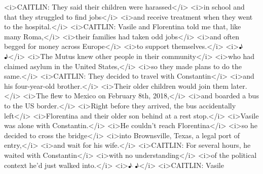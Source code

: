 \begin{itemize}
  \textless{}i\textgreater{}CAITLIN: They said their children were
  harassed\textless{}/i\textgreater{} \textless{}i\textgreater{}in
  school and that they struggled to find jobs\textless{}/i\textgreater{}
  \textless{}i\textgreater{}and receive treatment when they went to the
  hospital.\textless{}/i\textgreater{}
  \textless{}i\textgreater{}CAITLIN: Vasile and Florentina told me that,
  like many Roma,\textless{}/i\textgreater{}
  \textless{}i\textgreater{}their families had taken odd
  jobs\textless{}/i\textgreater{} \textless{}i\textgreater{}and often
  begged for money across Europe\textless{}/i\textgreater{}
  \textless{}i\textgreater{}to support
  themselves.\textless{}/i\textgreater{} \textless{}i\textgreater{}♪
  ♪\textless{}/i\textgreater{} \textless{}i\textgreater{}The Mutus knew
  other people in their community\textless{}/i\textgreater{}
  \textless{}i\textgreater{}who had claimed asylum in the United
  States,\textless{}/i\textgreater{} \textless{}i\textgreater{}so they
  made plans to do the same.\textless{}/i\textgreater{}
  \textless{}i\textgreater{}CAITLIN: They decided to travel with
  Constantin\textless{}/i\textgreater{} \textless{}i\textgreater{}and
  his four-year-old brother.\textless{}/i\textgreater{}
  \textless{}i\textgreater{}Their older children would join them
  later.\textless{}/i\textgreater{} \textless{}i\textgreater{}The flew
  to Mexico on February 8th, 2018,\textless{}/i\textgreater{}
  \textless{}i\textgreater{}and boarded a bus to the US
  border.\textless{}/i\textgreater{} \textless{}i\textgreater{}Right
  before they arrived, the bus accidentally
  left\textless{}/i\textgreater{} \textless{}i\textgreater{}Florentina
  and their older son behind at a rest stop.\textless{}/i\textgreater{}
  \textless{}i\textgreater{}Vasile was alone with
  Constantin.\textless{}/i\textgreater{} \textless{}i\textgreater{}He
  couldn't reach Florentina\textless{}/i\textgreater{}
  \textless{}i\textgreater{}so he decided to cross the
  bridge\textless{}/i\textgreater{} \textless{}i\textgreater{}into
  Brownsville, Texas, a legal port of entry,\textless{}/i\textgreater{}
  \textless{}i\textgreater{}and wait for his
  wife.\textless{}/i\textgreater{} \textless{}i\textgreater{}CAITLIN:
  For several hours, he waited with
  Constantin\textless{}/i\textgreater{} \textless{}i\textgreater{}with
  no understanding\textless{}/i\textgreater{}
  \textless{}i\textgreater{}of the political context he'd just walked
  into.\textless{}/i\textgreater{} \textless{}i\textgreater{}♪
  ♪\textless{}/i\textgreater{} \textless{}i\textgreater{}CAITLIN: Vasile

\end{itemize}
